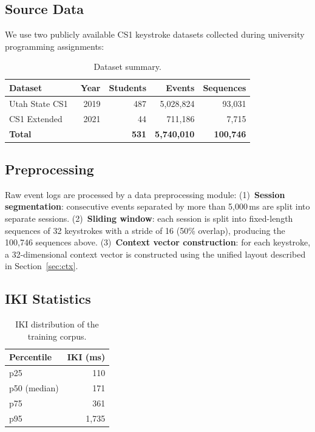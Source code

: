 \documentclass[sigconf,nonacm]{acmart}
\begin{document}
\subsection{Source Data}

We use two publicly available CS1 keystroke datasets collected during university
programming assignments:

\begin{table}[t]
\centering
\caption{Dataset summary.}
\begin{tabular}{lrrrr}
\toprule
Dataset & Year & Students & Events & Sequences \\
\midrule
Utah State CS1~\cite{leinonen2019cs1} & 2019 & 487 & 5,028,824 & 93,031 \\
CS1 Extended~\cite{pirkola2021cs1}    & 2021 & 44  &   711,186 &  7,715 \\
\midrule
\textbf{Total} & & \textbf{531} & \textbf{5,740,010} & \textbf{100,746} \\
\bottomrule
\end{tabular}
\label{tab:dataset}
\end{table}

\subsection{Preprocessing}

Raw event logs are processed by a data preprocessing module:
(1)~\textbf{Session segmentation}: consecutive events separated by more than 5{,}000\,ms
are split into separate sessions.
(2)~\textbf{Sliding window}: each session is split into fixed-length sequences of 32
keystrokes with a stride of 16 (50\% overlap), producing the 100,746 sequences above.
(3)~\textbf{Context vector construction}: for each keystroke, a 32-dimensional context
vector is constructed using the unified layout described in Section~\ref{sec:ctx}.

\subsection{IKI Statistics}

\begin{table}[t]
\centering
\caption{IKI distribution of the training corpus.}
\begin{tabular}{lr}
\toprule
Percentile & IKI (ms) \\
\midrule
p25 & 110 \\
p50 (median) & 171 \\
p75 & 361 \\
p95 & 1{,}735 \\
\bottomrule
\end{tabular}
\label{tab:iki}
\end{table}
\end{document}
